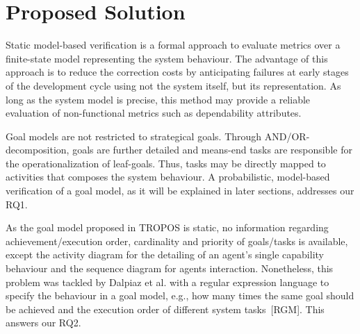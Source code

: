 \noindent{}\bigskip




\section{Proposed Solution}

Static model-based verification is a formal approach to evaluate metrics over a finite-state model representing the system behaviour. The advantage of this approach is to reduce the correction costs by anticipating failures at early stages of the development cycle using not the system itself, but its representation. As long as the system model is precise, this method may provide a reliable evaluation of non-functional metrics such as dependability attributes. 

Goal models are not restricted to strategical goals. Through AND/OR-decomposition, goals are further detailed and means-end tasks are responsible for the operationalization of leaf-goals. Thus, tasks may be directly mapped to activities that composes the system behaviour. A probabilistic, model-based verification of a goal model, as it will be explained in later sections, addresses our RQ1.


As the goal model proposed in TROPOS is static, no information regarding achievement/execution order, cardinality and priority of goals/tasks is available, except the activity diagram for the detailing of an agent's single capability behaviour and the sequence diagram for agents interaction. Nonetheless, this problem was tackled by Dalpiaz et al. with a regular expression language to specify the behaviour in a goal model, e.g., how many times the same goal should be achieved and the execution order of different system tasks~[RGM]. This answers our RQ2. 


